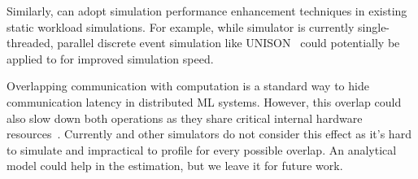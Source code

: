Similarly, \sys can adopt simulation performance enhancement techniques in existing static workload simulations. For example, while \sys simulator is currently single-threaded, parallel discrete event simulation like UNISON~\cite{bai2024unison} could potentially be applied to \sys for improved simulation speed.

Overlapping communication with computation is a standard way to hide communication latency in distributed ML systems. However, this overlap could also slow down both operations as they share critical internal hardware resources~\cite{liu2024deepseek}. Currently \sys and other simulators do not consider this effect as it's hard to simulate and impractical to profile for every possible overlap. An analytical model could help in the estimation, but we leave it for future work.

